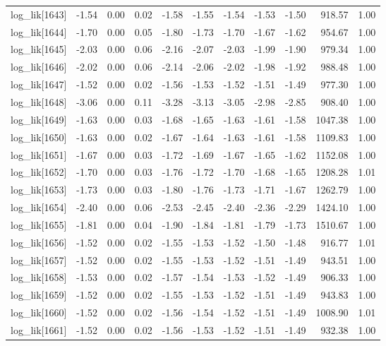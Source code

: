 \begin{table}[ht]
\begin{tabular}{rrrrrrrrrrr}
  log\_lik[1643] & -1.54 & 0.00 & 0.02 & -1.58 & -1.55 & -1.54 & -1.53 & -1.50 & 918.57 & 1.00 \\ 
  log\_lik[1644] & -1.70 & 0.00 & 0.05 & -1.80 & -1.73 & -1.70 & -1.67 & -1.62 & 954.67 & 1.00 \\ 
  log\_lik[1645] & -2.03 & 0.00 & 0.06 & -2.16 & -2.07 & -2.03 & -1.99 & -1.90 & 979.34 & 1.00 \\ 
  log\_lik[1646] & -2.02 & 0.00 & 0.06 & -2.14 & -2.06 & -2.02 & -1.98 & -1.92 & 988.48 & 1.00 \\ 
  log\_lik[1647] & -1.52 & 0.00 & 0.02 & -1.56 & -1.53 & -1.52 & -1.51 & -1.49 & 977.30 & 1.00 \\ 
  log\_lik[1648] & -3.06 & 0.00 & 0.11 & -3.28 & -3.13 & -3.05 & -2.98 & -2.85 & 908.40 & 1.00 \\ 
  log\_lik[1649] & -1.63 & 0.00 & 0.03 & -1.68 & -1.65 & -1.63 & -1.61 & -1.58 & 1047.38 & 1.00 \\ 
  log\_lik[1650] & -1.63 & 0.00 & 0.02 & -1.67 & -1.64 & -1.63 & -1.61 & -1.58 & 1109.83 & 1.00 \\ 
  log\_lik[1651] & -1.67 & 0.00 & 0.03 & -1.72 & -1.69 & -1.67 & -1.65 & -1.62 & 1152.08 & 1.00 \\ 
  log\_lik[1652] & -1.70 & 0.00 & 0.03 & -1.76 & -1.72 & -1.70 & -1.68 & -1.65 & 1208.28 & 1.01 \\ 
  log\_lik[1653] & -1.73 & 0.00 & 0.03 & -1.80 & -1.76 & -1.73 & -1.71 & -1.67 & 1262.79 & 1.00 \\ 
  log\_lik[1654] & -2.40 & 0.00 & 0.06 & -2.53 & -2.45 & -2.40 & -2.36 & -2.29 & 1424.10 & 1.00 \\ 
  log\_lik[1655] & -1.81 & 0.00 & 0.04 & -1.90 & -1.84 & -1.81 & -1.79 & -1.73 & 1510.67 & 1.00 \\ 
  log\_lik[1656] & -1.52 & 0.00 & 0.02 & -1.55 & -1.53 & -1.52 & -1.50 & -1.48 & 916.77 & 1.01 \\ 
  log\_lik[1657] & -1.52 & 0.00 & 0.02 & -1.55 & -1.53 & -1.52 & -1.51 & -1.49 & 943.51 & 1.00 \\ 
  log\_lik[1658] & -1.53 & 0.00 & 0.02 & -1.57 & -1.54 & -1.53 & -1.52 & -1.49 & 906.33 & 1.00 \\ 
  log\_lik[1659] & -1.52 & 0.00 & 0.02 & -1.55 & -1.53 & -1.52 & -1.51 & -1.49 & 943.83 & 1.00 \\ 
  log\_lik[1660] & -1.52 & 0.00 & 0.02 & -1.56 & -1.54 & -1.52 & -1.51 & -1.49 & 1008.90 & 1.01 \\ 
  log\_lik[1661] & -1.52 & 0.00 & 0.02 & -1.56 & -1.53 & -1.52 & -1.51 & -1.49 & 932.38 & 1.00 \\ 

\end{tabular}
\end{table}
